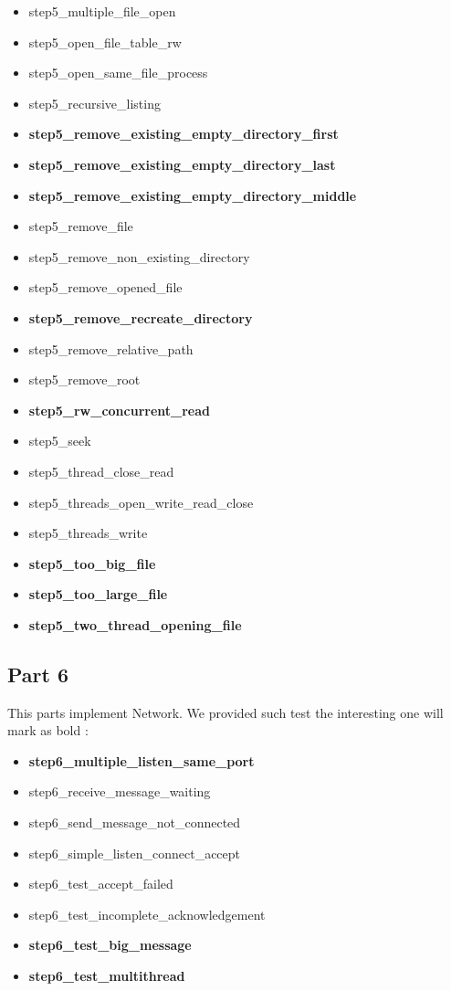 \documentclass[a4paper,10pt]{article}
\begin{document}
\begin{itemize}
\item step5_multiple_file_open
\item {step5_open_file_table_rw}
\item step5_open_same_file_process
\item step5_recursive_listing
\item {\bf step5_remove_existing_empty_directory_first}
\item {\bf step5_remove_existing_empty_directory_last}
\item {\bf step5_remove_existing_empty_directory_middle}
\item step5_remove_file
\item step5_remove_non_existing_directory
\item step5_remove_opened_file
\item {\bf step5_remove_recreate_directory}
\item step5_remove_relative_path
\item step5_remove_root
\item {\bf step5_rw_concurrent_read}
\item step5_seek
\item step5_thread_close_read
\item step5_threads_open_write_read_close
\item step5_threads_write
\item {\bf step5_too_big_file}
\item {\bf step5_too_large_file}
\item {\bf step5_two_thread_opening_file}
\end{itemize} 

\subsection{Part 6}

This parts implement Network. We provided such test the interesting one will mark as bold :
\begin{itemize}
\item {\bf step6_multiple_listen_same_port}
\item step6_receive_message_waiting
\item step6_send_message_not_connected
\item step6_simple_listen_connect_accept
\item step6_test_accept_failed
\item step6_test_incomplete_acknowledgement
\item {\bf step6_test_big_message}
\item {\bf step6_test_multithread}
\end{itemize} 
\end{document}
